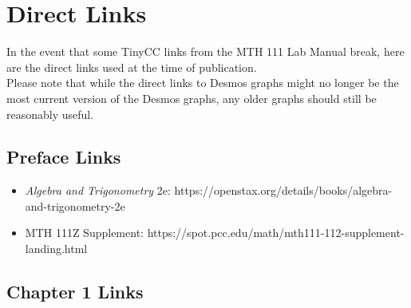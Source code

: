 

\section{Direct Links} \label{section-supplement-tinycc}

In the event that some TinyCC links from the MTH 111 Lab Manual break, here are the direct links used at the time of publication.\\

Please note that while the direct links to Desmos graphs might no longer be the most current version of the Desmos graphs, any older graphs should still be reasonably useful.

\subsection*{Preface Links} \label{linksfor-chapter1}

\begin{itemize}
	\item {\it Algebra and Trigonometry} 2e: https://openstax.org/details/books/algebra-and-trigonometry-2e
	\item MTH 111Z Supplement: https://spot.pcc.edu/math/mth111-112-supplement-landing.html
\end{itemize}


\subsection*{Chapter 1 Links} \label{linksfor-chapter1}

